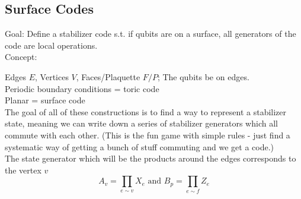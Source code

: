 \subsection{Surface Codes}
Goal: Define a stabilizer code s.t. if qubits are on a surface, all generators of the code are local operations. \\
Concept: \\
\begin{center}
\end{center}

Edges $E$, Vertices $V$, Faces/Plaquette $F/P$;
The qubits be on edges. \\
Periodic boundary conditions = toric code \\
Planar = surface code \\
The goal of all of these constructions is to find a way to represent a stabilizer state, meaning we can write down a series of stabilizer generators which all commute with each other. (This is the fun game with simple rules - just find a systematic way of getting a bunch of stuff commuting and we get a code.) \\

The state generator which will be the products around the edges corresponds to the vertex $v$
\begin{equation}
    A_v = \prod_{e \sim v} X_e \text{ and } B_p =  \prod_{e \sim f} Z_e
\end{equation}

